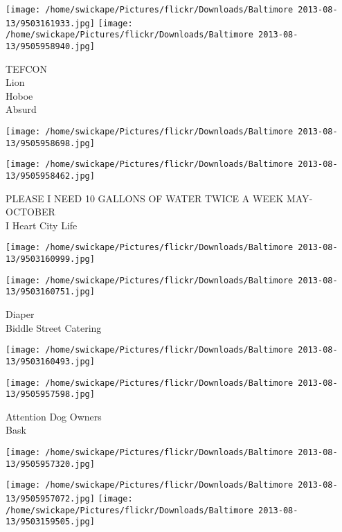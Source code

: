 \documentclass[10pt,letterpaper]{article}
\begin{document}
\texttt{[image: /home/swickape/Pictures/flickr/Downloads/Baltimore 2013-08-13/9503161933.jpg]}
\texttt{[image: /home/swickape/Pictures/flickr/Downloads/Baltimore 2013-08-13/9505958940.jpg]}

TEFCON\\
Lion\\
Hoboe\\
Absurd\\
\pagebreak

\texttt{[image: /home/swickape/Pictures/flickr/Downloads/Baltimore 2013-08-13/9505958698.jpg]}

\vspace{0.25in}
\texttt{[image: /home/swickape/Pictures/flickr/Downloads/Baltimore 2013-08-13/9505958462.jpg]}

PLEASE I NEED 10 GALLONS OF WATER TWICE A WEEK MAY{-}OCTOBER\\
I Heart City Life\\
\pagebreak

\texttt{[image: /home/swickape/Pictures/flickr/Downloads/Baltimore 2013-08-13/9503160999.jpg]}

\vspace{0.25in}
\texttt{[image: /home/swickape/Pictures/flickr/Downloads/Baltimore 2013-08-13/9503160751.jpg]}

Diaper\\
Biddle Street Catering\\
\pagebreak

\texttt{[image: /home/swickape/Pictures/flickr/Downloads/Baltimore 2013-08-13/9503160493.jpg]}

\vspace{0.25in}
\texttt{[image: /home/swickape/Pictures/flickr/Downloads/Baltimore 2013-08-13/9505957598.jpg]}

Attention Dog Owners\\
Bask\\
\pagebreak

\texttt{[image: /home/swickape/Pictures/flickr/Downloads/Baltimore 2013-08-13/9505957320.jpg]}

\vspace{0.25in}
\texttt{[image: /home/swickape/Pictures/flickr/Downloads/Baltimore 2013-08-13/9505957072.jpg]}
\texttt{[image: /home/swickape/Pictures/flickr/Downloads/Baltimore 2013-08-13/9503159505.jpg]}
\end{document}
